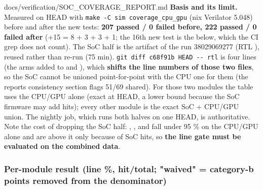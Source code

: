 \begin{relocated}{docs/verification/SOC_COVERAGE_REPORT.md}
\textbf{Basis and its limit.} Measured on HEAD  with
\texttt{make\ -\allowbreak{}C\ sim\ coverage\_\allowbreak{}cpu\_\allowbreak{}gpu}
(nix Verilator 5.048) before and after the new tests: \textbf{207 passed
/ 0 failed before, 222 passed / 0 failed after} (+15 = 8 + 3 + 3 + 1;
the 16th new test is the  below, which the CI grep
does not count). The SoC half is the  artifact of the
 run 38029069277 (RTL ), reused rather than re-run
(75 min).
\texttt{git\ diff\ c68f91b\ HEAD\ -\allowbreak{}-\allowbreak{}\ rtl} is
four lines (the  arms  added to
 and ), which
\textbf{shifts the line numbers of those two files}, so the SoC
 cannot be unioned point-for-point with the CPU one for them
(the report\textquotesingle s consistency section flags
 51/69 shared). For those two modules the
table uses the CPU/GPU  alone (exact at HEAD, a lower bound
because the SoC firmware may add hits); every other module is the exact
SoC + CPU/GPU union. The nightly job, which runs both halves on one
HEAD, is authoritative. Note the cost of dropping the SoC half:
, ,
 and  fall under 95 \% on the
CPU/GPU  alone and are above it only because of SoC hits, so
\textbf{the line gate must be evaluated on the combined data}.

\subsubsection{\texorpdfstring{Per-module result (line \%,
hit/\allowbreak{}total; "waived" = category-b points removed from the
denominator)}{Per-module result (line \%, hit/total; "waived" = category-b points removed from the denominator)}}\label{tm:flow:soc-coverage-report:per-module-result-line-hittotal-waived-category-b-points-removed-from-the-denominator}

\begin{landscape}
\small\setlength{\tabcolsep}{4pt}


\end{landscape}
\end{relocated}
